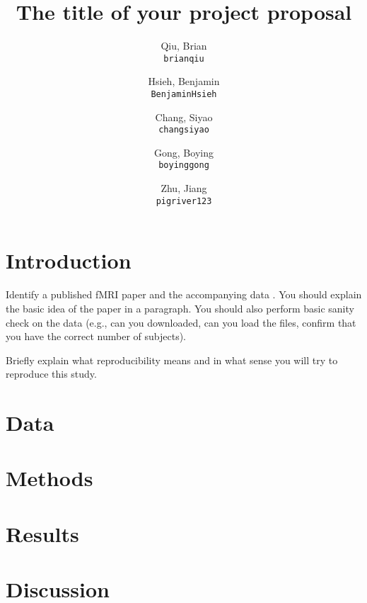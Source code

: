 \documentclass[11pt]{article}
\title{The title of your project proposal}
\author{
  Qiu, Brian\\
  \texttt{brianqiu}
  \and
  Hsieh, Benjamin\\
  \texttt{BenjaminHsieh}
  \and
   Chang, Siyao \\
  \texttt{changsiyao}
  \and
  Gong, Boying\\
  \texttt{boyinggong}
  \and
  Zhu, Jiang\\
  \texttt{pigriver123}
}
\begin{document}
\maketitle


\section{Introduction}

Identify a published fMRI paper and the accompanying data
\cite{lindquist2008statistical}.  You should explain the basic idea of the
paper in a paragraph.  You should also perform basic sanity check on the data
(e.g., can you downloaded, can you load the files, confirm that you have the
correct number of subjects).

Briefly explain what reproducibility means and in what sense you will
try to reproduce this study.

\section{Data}

\section{Methods}
\section{Results}
\section{Discussion}



\end{document}
